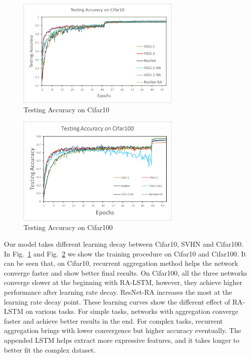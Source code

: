 \documentclass[runningheads]{llncs}
\begin{document}
\begin{figure}   
	\centering
	\includegraphics[width=8cm]{Figures/cifar10.png}
	\caption{Testing Accuracy on Cifar10}
	\label{fig:Cifar10}
\end{figure}
\begin{figure}  
	\centering
	\includegraphics[width=8cm]{Figures/cifar100.png}
	\caption{Testing Accuracy on Cifar100}
	\label{fig:Cifar100}
\end{figure}

Our model takes different learning decay between Cifar10, SVHN and Cifar100. In Fig.~\ref{fig:Cifar10} and Fig.~\ref{fig:Cifar100} we show the training procedure on Cifar10 and Cifar100. It can be seen that, on Cifar10, recurrent aggregation method helps the network converge faster and show better final results. On Cifar100, all the three networks converge slower at the beginning with RA-LSTM, however, they achieve higher performance after learning rate decay. ResNet-RA increases the most at the learning rate decay point. These learning curves show the different effect of RA-LSTM on various tasks. For simple tasks, networks with aggregation converge faster and achieve better results in the end. For complex tasks, recurrent aggregation brings with lower convergence but higher accuracy eventually. The appended LSTM helps extract more expressive features, and it takes longer to better fit the complex dataset.
\end{document}
